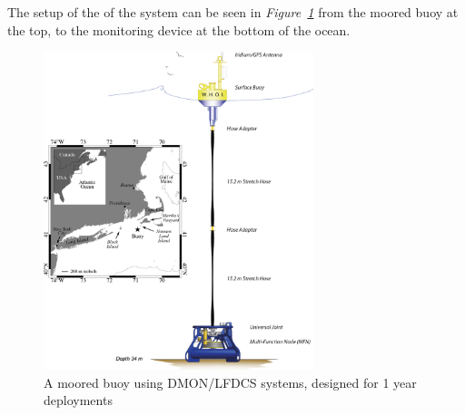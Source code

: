 The setup of the of the system can be seen in \textit{Figure~\ref{fig:DMON/LFDCS}} from the moored buoy at the top, to the monitoring device at the bottom of the ocean.

\begin{figure}[h]
    \centering
    \includegraphics[width=0.70\textwidth]{graphics/DMONbuoy.jpg}
    \caption{A moored buoy using DMON/LFDCS systems, designed for 1 year deployments\cite{baumgartner_persistent_2019}}
    \label{fig:DMON/LFDCS}
\end{figure}





